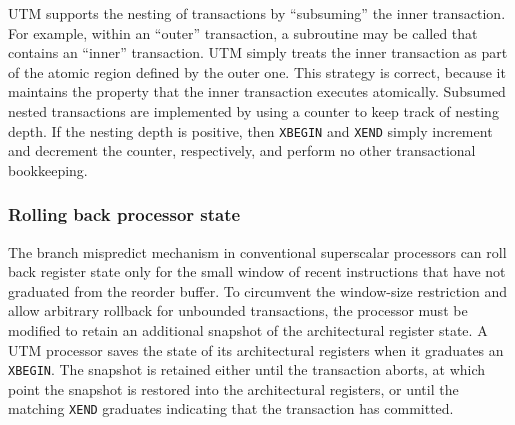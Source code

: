 UTM supports the nesting of transactions by ``subsuming'' the inner
transaction.  For example, within an ``outer'' transaction, a
subroutine may be called that contains an ``inner'' transaction.
UTM simply treats the inner transaction as part of the atomic
region defined by the outer one.  This strategy is correct, because it
maintains the property that the inner transaction executes atomically.
Subsumed nested transactions are implemented by using a counter to
keep track of nesting depth.  If the nesting depth is positive, then
\texttt{XBEGIN} and \texttt{XEND} simply increment and decrement the
counter, respectively, and perform no other transactional bookkeeping.

\subsubsection{Rolling back processor state}

The branch mispredict mechanism in conventional superscalar processors
can roll back register state only for the small window of recent
instructions that have not graduated from the reorder buffer.  To
circumvent the window-size restriction and allow arbitrary rollback
for unbounded transactions, the processor must be modified to retain
an additional snapshot of the architectural register state.  A UTM
processor saves the state of its architectural registers when it
graduates an \texttt{XBEGIN}\@.  The snapshot is retained either until
the transaction aborts, at which point the snapshot is restored into
the architectural registers, or until the matching \texttt{XEND}
graduates indicating that the transaction has committed.

